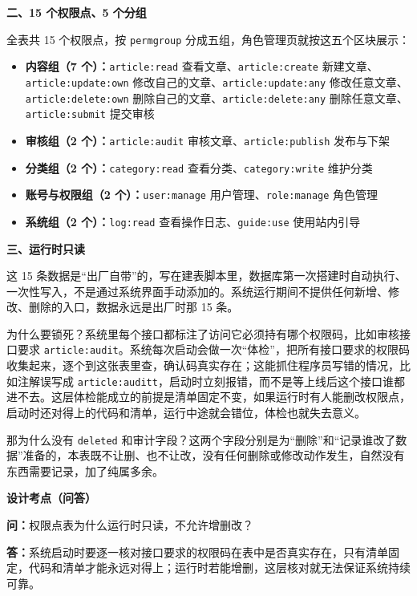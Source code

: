 \documentclass[zihao=-4,UTF8,openany]{ctexart}
\renewcommand{\_}{\textunderscore\allowbreak}
\begin{document}
\noindent\textbf{二、15 个权限点、5 个分组}

全表共 15 个权限点，按 \texttt{perm\_group} 分成五组，角色管理页就按这五个区块展示：

\begin{itemize}
\item \textbf{内容组（7 个）：}\texttt{article:read} 查看文章、\texttt{article:create} 新建文章、\texttt{article:update:own} 修改自己的文章、\texttt{article:update:any} 修改任意文章、\texttt{article:delete:own} 删除自己的文章、\texttt{article:delete:any} 删除任意文章、\texttt{article:submit} 提交审核
\item \textbf{审核组（2 个）：}\texttt{article:audit} 审核文章、\texttt{article:publish} 发布与下架
\item \textbf{分类组（2 个）：}\texttt{category:read} 查看分类、\texttt{category:write} 维护分类
\item \textbf{账号与权限组（2 个）：}\texttt{user:manage} 用户管理、\texttt{role:manage} 角色管理
\item \textbf{系统组（2 个）：}\texttt{log:read} 查看操作日志、\texttt{guide:use} 使用站内引导
\end{itemize}

\noindent\textbf{三、运行时只读}

这 15 条数据是“出厂自带”的，写在建表脚本里，数据库第一次搭建时自动执行、一次性写入，不是通过系统界面手动添加的。系统运行期间不提供任何新增、修改、删除的入口，数据永远是出厂时那 15 条。

为什么要锁死？系统里每个接口都标注了访问它必须持有哪个权限码，比如审核接口要求 \texttt{article:audit}。系统每次启动会做一次“体检”，把所有接口要求的权限码收集起来，逐个到这张表里查，确认码真实存在；这能抓住程序员写错的情况，比如注解误写成 \texttt{article:auditt}，启动时立刻报错，而不是等上线后这个接口谁都进不去。这层体检能成立的前提是清单固定不变，如果运行时有人能删改权限点，启动时还对得上的代码和清单，运行中途就会错位，体检也就失去意义。

那为什么没有 \texttt{deleted} 和审计字段？这两个字段分别是为“删除”和“记录谁改了数据”准备的，本表既不让删、也不让改，没有任何删除或修改动作发生，自然没有东西需要记录，加了纯属多余。

\noindent\textbf{设计考点（问答）}

\noindent\textbf{问：}权限点表为什么运行时只读，不允许增删改？

\noindent\textbf{答：}系统启动时要逐一核对接口要求的权限码在表中是否真实存在，只有清单固定，代码和清单才能永远对得上；运行时若能增删，这层核对就无法保证系统持续可靠。
\end{document}
